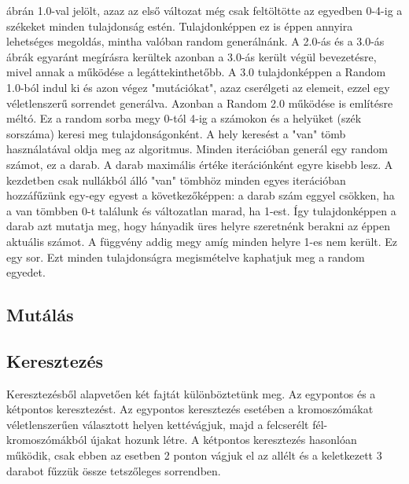 \documentclass[12ppt,a4paper,oneside]{report}
\begin{document}
         { ábrán 1.0-val jelölt, azaz az első változat még csak feltöltötte az egyedben 0-4-ig a székeket minden tulajdonság estén. Tulajdonképpen ez is éppen annyira lehetséges megoldás, mintha valóban random generálnánk. A 2.0-ás és a 3.0-ás ábrák egyaránt megírásra kerültek azonban a 3.0-ás került végül bevezetésre, mivel annak a működése a legáttekinthetőbb. A 3.0 tulajdonképpen a Random 1.0-ból indul ki és azon végez "mutációkat", azaz cserélgeti az elemeit, ezzel egy véletlenszerű sorrendet generálva. Azonban a Random 2.0 működése is említésre méltó. Ez a random sorba megy 0-tól 4-ig a számokon és a helyüket (szék sorszáma) keresi meg tulajdonságonként. A hely keresést a "van" tömb használatával oldja meg az algoritmus. Minden iterációban generál egy random számot, ez a darab. A darab maximális értéke iterációnként egyre kisebb lesz. A kezdetben csak nullákból álló "van" tömbhöz minden egyes iterációban hozzáfűzünk egy-egy egyest a következőképpen: a darab szám eggyel csökken, ha a van tömbben 0-t találunk és változatlan marad, ha 1-est. Így tulajdonképpen a darab azt mutatja meg, hogy hányadik üres helyre szeretnénk berakni az éppen aktuális számot. A függvény addig megy amíg minden helyre 1-es nem került. Ez egy sor. Ezt minden tulajdonságra megismételve kaphatjuk meg a random egyedet.}
            
        \subsection{Mutálás} %
            
        \subsection{Keresztezés} %
            
            {Keresztezésből alapvetően két fajtát különböztetünk meg. Az egypontos és a kétpontos keresztezést. Az egypontos keresztezés esetében a kromoszómákat véletlenszerűen választott helyen kettévágjuk, majd a felcserélt fél-kromoszómákból újakat hozunk létre.  A kétpontos keresztezés hasonlóan működik, csak ebben az esetben 2 ponton vágjuk el az allélt és a keletkezett 3 darabot fűzzük össze tetszőleges sorrendben.}
                        
\end{document}
